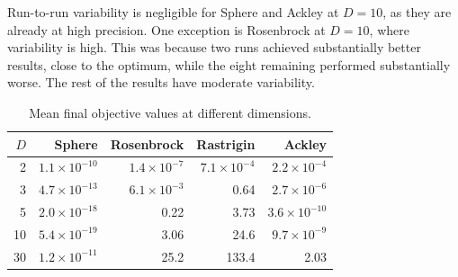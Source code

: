 Run-to-run variability is negligible for Sphere and Ackley at $D=10$, as they are already at high precision.
One exception is Rosenbrock at $D=10$, where variability is high. This was because two runs achieved substantially better results, close to the optimum, while the eight remaining performed substantially worse.
The rest of the results have moderate variability.

\begin{table}[ht]
\centering
\caption{Mean final objective values at different dimensions.}
\label{tab:ba-dims}
\begin{tabular}{rrrrr}
\toprule
$D$ & Sphere & Rosenbrock & Rastrigin & Ackley \\
\midrule
2  & $1.1\times10^{-10}$ & $1.4\times10^{-7}$ & $7.1\times10^{-4}$ & $2.2\times10^{-4}$ \\
3  & $4.7\times10^{-13}$ & $6.1\times10^{-3}$ & 0.64  & $2.7\times10^{-6}$ \\
5  & $2.0\times10^{-18}$ & 0.22  & 3.73  & $3.6\times10^{-10}$ \\
10 & $5.4\times10^{-19}$ & 3.06  & 24.6  & $9.7\times10^{-9}$ \\
30 & $1.2\times10^{-11}$ & 25.2  & 133.4 & 2.03 \\
\bottomrule
\end{tabular}
\end{table}
